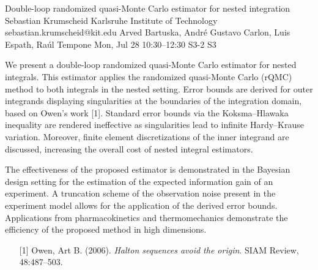 \begin{talk}
  {Double-loop randomized quasi-Monte Carlo estimator for nested integration}%
  {Sebastian Krumscheid}%
  {Karlsruhe Institute of Technology}%
  {sebastian.krumscheid@kit.edu}%
  {Arved Bartuska, Andr\'{e} Gustavo Carlon, Luis Espath, Ra\'{u}l Tempone}%
  {}%
  {Mon, Jul 28 10:30–12:30}%
  {S3-2}%
  {S3}%
  
				
			
We present a double-loop randomized quasi-Monte Carlo estimator for nested integrals. This estimator applies the randomized quasi-Monte Carlo (rQMC) method to both integrals in the nested setting. Error bounds are derived for outer integrands displaying singularities at the boundaries of the integration domain, based on Owen's work [1]. Standard error bounds via the Koksma--Hlawaka inequality are rendered ineffective as singularities lead to infinite Hardy--Krause variation. Moreover, finite element discretizations of the inner integrand are discussed, increasing the overall cost of nested integral estimators. 

The effectiveness of the proposed estimator is demonstrated in the Bayesian design setting for the estimation of the expected information gain of an experiment. A truncation scheme of the observation noise present in the experiment model allows for the application of the derived error bounds. Applications from pharmacokinetics and thermomechanics demonstrate the efficiency of the proposed method in high dimensions.

\medskip

\begin{enumerate}
	\item[{[1]}] Owen, Art B. (2006). {\it Halton sequences avoid the origin}. SIAM Review, 48:487–503.
\end{enumerate}

\end{talk}

